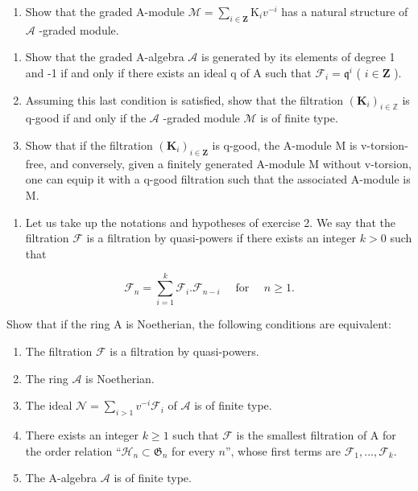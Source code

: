 \begin{enumerate}
\def\labelenumi{\alph{enumi})}
\tightlist
\item
  Show that the graded A-module \(\mathcal{M} = \sum_{i\in \mathbf{Z}}\mathrm{K}_{i}v^{-i}\) has a natural structure of \(\mathcal{A}\) -graded module.
\end{enumerate}



\begin{enumerate}
\def\labelenumi{\alph{enumi})}
\setcounter{enumi}{1}
\item
  Show that the graded A-algebra \(\mathcal{A}\) is generated by its elements of degree 1 and -1 if and only if there exists an ideal q of A such that \(\mathcal{F}_i = \mathfrak{q}^i\) ( \(i \in \mathbf{Z}\) ).
\item
  Assuming this last condition is satisfied, show that the filtration \((\mathbf{K}_i)_{i\in \mathbb{Z}}\) is q-good if and only if the \(\mathcal{A}\) -graded module \(\mathcal{M}\) is of finite type.
\item
  Show that if the filtration \((\mathbf{K}_{i})_{i\in\mathbf{Z}}\) is q-good, the A-module M is v-torsion-free, and conversely, given a finitely generated A-module M without v-torsion, one can equip it with a q-good filtration such that the associated A-module is M.
\end{enumerate}

\begin{enumerate}
\def\labelenumi{\arabic{enumi})}
\setcounter{enumi}{3}
\tightlist
\item
  Let us take up the notations and hypotheses of exercise 2. We say that the filtration \(\mathcal{F}\) is a filtration by quasi-powers if there exists an integer \(k > 0\) such that
\end{enumerate}

\[
\mathcal {F} _ {n} = \sum_ {i = 1} ^ {k} \mathcal {F} _ {i}. \mathcal {F} _ {n - i} \quad \text { for } \quad n \geqslant 1.
\]

Show that if the ring A is Noetherian, the following conditions are equivalent:

\begin{enumerate}
\def\labelenumi{(\roman{enumi})}
\item
  The filtration \(\mathcal{F}\) is a filtration by quasi-powers.
\item
  The ring \(\mathcal{A}\) is Noetherian.
\item
  The ideal \(\mathcal{N} = \sum_{i > 1} v^{-i}\mathcal{F}_i\) of \(\mathcal{A}\) is of finite type.
\item
  There exists an integer \(k \geqslant 1\) such that \(\mathcal{F}\) is the smallest filtration of A for the order relation “\(\mathcal{H}_n \subset \mathfrak{G}_n\) for every \(n\)”, whose first terms are \(\mathcal{F}_1, ..., \mathcal{F}_k\).
\item
  The A-algebra \(\mathcal{A}\) is of finite type.
\end{enumerate}

